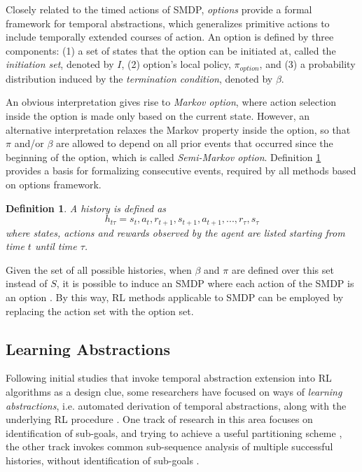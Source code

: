 \documentclass[10pt, conference, compsocconf]{IEEEtran}
\begin{document}
Closely related to the timed actions of SMDP, \textit{options} \cite{sutton_between_1999} provide a formal framework for temporal abstractions, which generalizes primitive actions to include temporally extended courses of action. An option is defined by three components: (1) a set of states that the option can be initiated at, called the \textit{initiation set}, denoted by $I$, (2) option's local policy, $\pi_{option}$, 
and (3) a probability distribution induced by the \textit{termination condition}, denoted by $\beta$. 

An obvious interpretation gives rise to \textit{Markov option}, where action selection inside the option is made only based on the current state. However, an alternative interpretation relaxes the Markov property inside the option, so that $\pi$ and/or $\beta$ are allowed to depend on all prior events that occurred since the beginning of the option, which is called \textit{Semi-Markov option}. Definition \ref{def:history} provides a basis for formalizing consecutive events, required by all methods based on options framework.
\newtheorem{definition}{Definition}
\begin{definition}
\label{def:history}
\textit{A \textit{history} is defined as}
\begin{displaymath}
h_{t\tau}=s_t,a_t,r_{t+1},s_{t+1},a_{t+1},...,r_{\tau},s_{\tau}
\end{displaymath}
\textit{where states, actions and rewards observed by the agent are listed starting from time $t$ until time $\tau$.}
\end{definition}

Given the set of all possible histories, when $\beta$ and $\pi$ are defined over this set instead of $S$, it is possible to induce an SMDP where each action of the SMDP is an option \cite{sutton_between_1999}. By this way, RL methods applicable to SMDP can be employed by replacing the action set with the option set.



\subsection{Learning Abstractions}
\label{sec:learning_abstractions}
Following initial studies that invoke temporal abstraction extension into RL algorithms as a design clue, some researchers have focused on ways of \textit{learning abstractions}, i.e. automated derivation of temporal abstractions, along with the underlying RL procedure \cite{barto_recent_2003}. One track of research in this area focuses on identification of sub-goals, and trying to achieve a useful partitioning scheme \cite{mcgovern_automatic_2001,stolle_learning_2002, mannor_dynamic_2004,simsek_using_2004,hengst_discovering_2002},  the other track invokes common sub-sequence analysis of multiple successful histories, without identification of sub-goals \cite{mcgovern_autonomous_2002, girgin_improving_2010}. 
\end{document}
